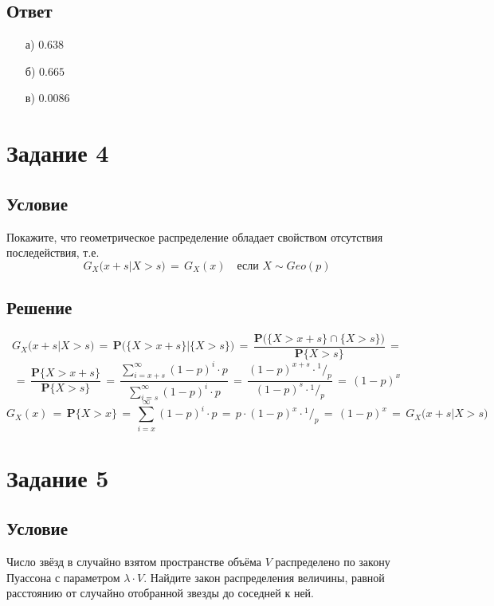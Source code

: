 \documentclass{article}
\newcommand*\rfrac[2]{{}^{#1}\!/_{#2}}
\begin{document}
\subsection*{Ответ}
\begin{enumerate}
\item[а)] $ 0.638 $
\item[б)] $ 0.665 $
\item[в)] $ 0.0086 $
\end{enumerate}
\section*{Задание 4}
\subsection*{Условие}
Покажите, что геометрическое распределение обладает свойством отсутствия последействия, т.е.
\[ G_X \Big( x \! + \! s \big| X \! > \! s \Big) \, = \, G_X(x) \quad \text{если } X \! \sim \! Geo(p) \]
\subsection*{Решение}
\[ G_X \Big( x \! + \! s \big| X \! > \! s \Big) \, = \, \mathbf{P} \bigg( \big\{ X \! > \! x \! + \! s \big\} \big| \big\{ X \! > \! s \big\} \bigg) \, = \, \dfrac{\mathbf{P} \bigg( \big\{ X \! > \! x \! + \! s \big\} \cap \big\{ X \! > \! s \big\} \bigg)}{\mathbf{P} \big\{ X \! > \! s \big\}} \, = \]
\[ = \, \dfrac{\mathbf{P} \big\{ X \! > \! x \! + \! s \big\}}{\mathbf{P} \big\{ X \! > \! s \big\}} \, = \, \dfrac{\sum\limits_{i=x+s}^\infty (1 \! - \! p)^i \! \cdot \! p}{\sum\limits_{i=s}^\infty (1 \! - \! p)^i \! \cdot \! p} \, = \, \dfrac{(1 \! - \! p)^{x+s} \! \cdot \! \rfrac{1}{p}}{(1 \! - \! p)^{s} \! \cdot \! \rfrac{1}{p}} \, = \, (1 \! - \! p)^x \]
\[ G_X(x) \, = \, \mathbf{P} \big\{ X \! > \! x \big\} \, = \, \sum\limits_{i=x}^\infty (1 \! - \! p)^i \! \cdot \!p \, = \, p \! \cdot \! (1 \! - \! p)^{x} \! \cdot \! \rfrac{1}{p} \, = \, (1 \! - \! p)^{x} \, = \, G_X \Big( x \! + \! s \big| X \! > \! s \Big) \]
\section*{Задание 5}
\subsection*{Условие}
Число звёзд в случайно взятом пространстве объёма $ V $ распределено по закону Пуассона с параметром $ \lambda \! \cdot \! V $. Найдите закон распределения величины, равной расстоянию от случайно отобранной звезды до соседней к ней.
\end{document}
